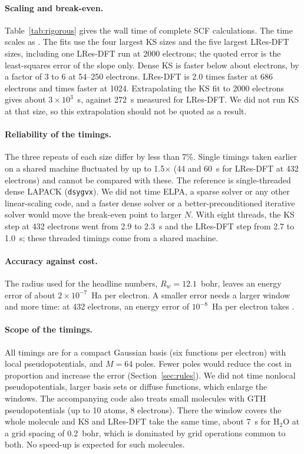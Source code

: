 \documentclass[aps,prb,twocolumn,superscriptaddress,floatfix,longbibliography]{revtex4-2}
\theoremstyle{remark}
\begin{document}
\paragraph*{Scaling and break-even.} Table~\ref{tab:rigorous} gives the wall time of complete SCF calculations. The time
scales as . The fits use the four largest KS sizes and the five largest LRes-DFT sizes,
including one LRes-DFT run at 2000 electrons; the quoted error is the least-squares error of the slope only. Dense KS is
faster below about  electrons, by a factor of 3 to 6 at 54--250 electrons. LRes-DFT is 2.0
times faster at 686 electrons and  times faster at 1024. Extrapolating the KS fit to 2000
electrons gives about $3\times10^{3}$~s, against 272~s measured for LRes-DFT. We did not run KS at that size, so this
extrapolation should not be quoted as a result.

\paragraph*{Reliability of the timings.} The three repeats of each size differ by less than 7\%. Single timings taken earlier on a shared machine fluctuated by up to 1.5$\times$ (44 and
60~s for LRes-DFT at 432 electrons) and cannot be compared with these. The reference is single-threaded dense LAPACK
(\texttt{dsygvx}). We did not time ELPA, a sparse solver or any other linear-scaling code, and a faster dense solver or a
better-preconditioned iterative solver would move the break-even point to larger $N$. With eight threads, the KS step at
432 electrons went from 2.9 to 2.3~s and the LRes-DFT step from 2.7 to 1.0~s; these threaded timings come from a shared
machine.

\paragraph*{Accuracy against cost.} The radius used for the headline numbers, $R_w=12.1$~bohr, leaves an energy error of
about $2\times10^{-7}$~Ha per electron. A smaller error needs a larger window and more time: at 432 electrons, an energy error
of $10^{-8}$~Ha per electron takes .

\paragraph*{Scope of the timings.} All timings are for a compact Gaussian basis (six functions per electron) with local
pseudopotentials, and $M=64$ poles. Fewer poles would reduce the cost in proportion and increase the error
(Section~\ref{sec:rules}). We did not time nonlocal pseudopotentials, larger basis sets or diffuse functions, which enlarge
the windows. The accompanying code also treats small molecules with GTH pseudopotentials (up to 10 atoms, 8 electrons). There
the window covers the whole molecule and KS and LRes-DFT take the same time, about 7~s for H$_2$O at a grid spacing of
0.2~bohr, which is dominated by grid operations common to both. No speed-up is expected for such molecules.
\end{document}
